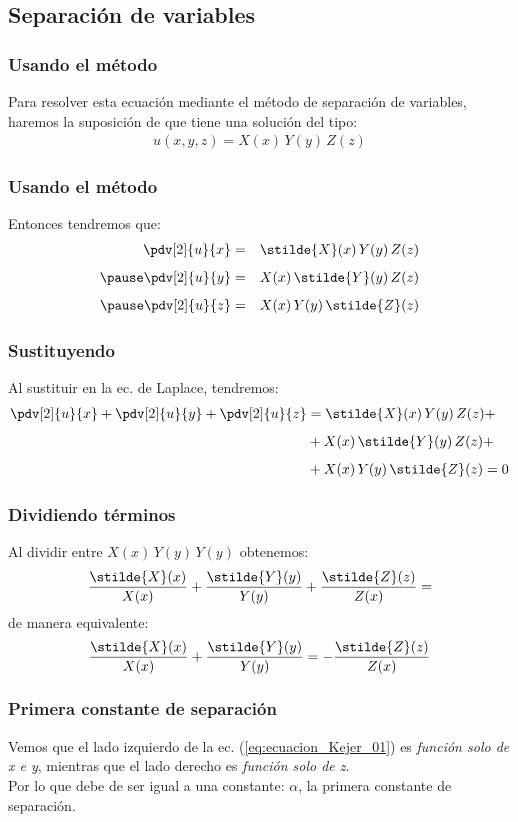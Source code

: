 \subsection{Separación de variables}
\begin{frame}
\frametitle{Usando el método}
Para resolver esta ecuación mediante el método de separación de variables, haremos la suposición de que tiene una solución del tipo:
\begin{align*}
u(x, y, z) = X(x) \, Y(y) \, Z(z)
\end{align*}
\end{frame}
\begin{frame}
\frametitle{Usando el método}
Entonces tendremos que:
\begin{eqnarray*}
\pdv[2]{u}{x} &=& \stilde{X} (x) \, Y(y) \, Z (z) \\[0.5em] \pause
\pdv[2]{u}{y} &=& X (x) \, \stilde{Y} (y) \, Z (z) \\[0.5em] \pause
\pdv[2]{u}{z} &=& X (x) \, Y(y) \, \stilde{Z} (z)
\end{eqnarray*}
\end{frame}
\begin{frame}
\frametitle{Sustituyendo}
Al sustituir en la ec. de Laplace, tendremos:
\begin{align*}
\pdv[2]{u}{x} + \pdv[2]{u}{y} + \pdv[2]{u}{z} &= \stilde{X} (x) \, Y(y) \, Z (z) + \\[0.5em]
&+ X (x) \, \stilde{Y} (y) \, Z (z) + \\[0.5em]
&+ X (x) \, Y(y) \, \stilde{Z} (z) = 0
\end{align*}
\end{frame}
\begin{frame}
\frametitle{Dividiendo términos}
Al dividir entre $X(x) \, Y(y) \, Y(y)$ obtenemos:
\begin{align*}
\dfrac{\stilde{X} (x)}{X(x)} + \dfrac{\stilde{Y} (y)}{Y(y)} + \dfrac{\stilde{Z} (z)}{Z(x)} =
\end{align*}
\pause
de manera equivalente:
\begin{align}
\dfrac{\stilde{X} (x)}{X(x)} + \dfrac{\stilde{Y} (y)}{Y(y)} = -  \dfrac{\stilde{Z} (z)}{Z(x)}
\label{eq:ecuacion_Kejer_01}
\end{align}
\end{frame}
\begin{frame}
\frametitle{Primera constante de separación}
Vemos que el lado izquierdo de la ec. (\ref{eq:ecuacion_Kejer_01}) es \emph{función solo de x e y}, mientras que el lado derecho es \emph{función solo de z}.
\\
\bigskip
\pause
Por lo que debe de ser igual a una constante: $\alpha$, la primera constante de separación.
\end{frame}
